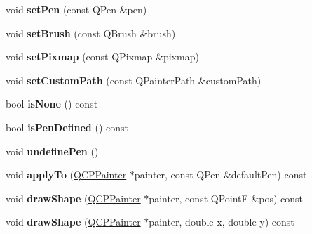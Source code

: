 \begin{DoxyCompactItemize}
\item 
void {\bfseries set\+Pen} (const Q\+Pen \&pen)\hypertarget{class_q_c_p_scatter_style_a761f1f229cc0ca4703e1e2b89f6dd1ba}{}\label{class_q_c_p_scatter_style_a761f1f229cc0ca4703e1e2b89f6dd1ba}

\item 
void {\bfseries set\+Brush} (const Q\+Brush \&brush)\hypertarget{class_q_c_p_scatter_style_a74d692aaeb8d4b36d6f7d510e44264b1}{}\label{class_q_c_p_scatter_style_a74d692aaeb8d4b36d6f7d510e44264b1}

\item 
void {\bfseries set\+Pixmap} (const Q\+Pixmap \&pixmap)\hypertarget{class_q_c_p_scatter_style_a5fb611d46acfac520d7b89a1c71d9246}{}\label{class_q_c_p_scatter_style_a5fb611d46acfac520d7b89a1c71d9246}

\item 
void {\bfseries set\+Custom\+Path} (const Q\+Painter\+Path \&custom\+Path)\hypertarget{class_q_c_p_scatter_style_a96a3e949f90b2afe5677ca9412a12a1e}{}\label{class_q_c_p_scatter_style_a96a3e949f90b2afe5677ca9412a12a1e}

\item 
bool {\bfseries is\+None} () const \hypertarget{class_q_c_p_scatter_style_aa3861281108d0adbeb291c820ea3925c}{}\label{class_q_c_p_scatter_style_aa3861281108d0adbeb291c820ea3925c}

\item 
bool {\bfseries is\+Pen\+Defined} () const \hypertarget{class_q_c_p_scatter_style_a7f1385a8d5e4f349a6b8030723fbd0f7}{}\label{class_q_c_p_scatter_style_a7f1385a8d5e4f349a6b8030723fbd0f7}

\item 
void {\bfseries undefine\+Pen} ()\hypertarget{class_q_c_p_scatter_style_acabc2a8c83d650b946f50c3166b6c35e}{}\label{class_q_c_p_scatter_style_acabc2a8c83d650b946f50c3166b6c35e}

\item 
void {\bfseries apply\+To} (\hyperlink{class_q_c_p_painter}{Q\+C\+P\+Painter} $\ast$painter, const Q\+Pen \&default\+Pen) const \hypertarget{class_q_c_p_scatter_style_a81817dfd404635f211e6ff2a04657d36}{}\label{class_q_c_p_scatter_style_a81817dfd404635f211e6ff2a04657d36}

\item 
void {\bfseries draw\+Shape} (\hyperlink{class_q_c_p_painter}{Q\+C\+P\+Painter} $\ast$painter, const Q\+PointF \&pos) const \hypertarget{class_q_c_p_scatter_style_aeaf6dbadb0b0e6d890a6e3bbe5aebece}{}\label{class_q_c_p_scatter_style_aeaf6dbadb0b0e6d890a6e3bbe5aebece}

\item 
void {\bfseries draw\+Shape} (\hyperlink{class_q_c_p_painter}{Q\+C\+P\+Painter} $\ast$painter, double x, double y) const \hypertarget{class_q_c_p_scatter_style_ae76811ac9f70ebf7a2b4c759853e6ed8}{}\label{class_q_c_p_scatter_style_ae76811ac9f70ebf7a2b4c759853e6ed8}

\end{DoxyCompactItemize}
